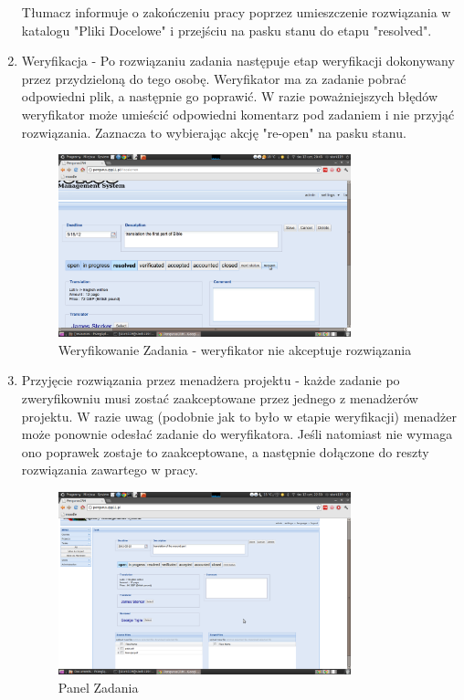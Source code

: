 \documentclass[licencjacka]{pracamgr}
\begin{document}
\begin{enumerate}
Tłumacz informuje o zakończeniu pracy poprzez umieszczenie rozwiązania w katalogu "Pliki Docelowe" i przejściu na pasku stanu do etapu "resolved".   
\item Weryfikacja - Po rozwiązaniu zadania następuje etap weryfikacji dokonywany przez przydzieloną do tego osobę. Weryfikator ma za zadanie pobrać odpowiedni plik, a następnie go poprawić. W razie poważniejszych błędów weryfikator może umieścić odpowiedni komentarz pod zadaniem i nie przyjąć rozwiązania. Zaznacza to wybierając akcję "re-open" na pasku stanu.	
\begin{figure}[ht!]
\centering
\includegraphics[width=0.8\textwidth]{resources/task_reopen.png}
\caption{Weryfikowanie Zadania - weryfikator nie akceptuje rozwiązania}
\end{figure}
\item Przyjęcie rozwiązania przez menadżera projektu - każde zadanie po zweryfikowniu musi zostać zaakceptowane przez jednego z menadżerów projektu. W razie uwag (podobnie jak to było w etapie weryfikacji) menadżer może ponownie odesłać zadanie do weryfikatora. Jeśli natomiast nie wymaga ono poprawek zostaje to zaakceptowane, a następnie dołączone do reszty rozwiązania zawartego w pracy.
\begin{figure}[ht!]
\centering
\includegraphics[width=0.8\textwidth]{resources/task.png}
\caption{Panel Zadania}
\end{figure}


\end{enumerate}
\end{document}
